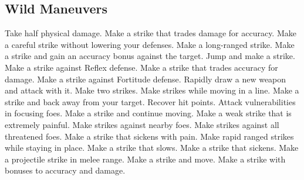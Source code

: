 \subsection{Wild Maneuvers}\label{Wild Maneuvers}
\begin{spelllist}
 Take half physical damage.
 Make a strike that trades damage for accuracy.
 Make a careful strike without lowering your defenses.
 Make a long-ranged strike.
 Make a strike and gain an accuracy bonus against the target.
 Jump and make a strike.
 Make a strike against Reflex defense.
 Make a strike that trades accuracy for damage.
 Make a strike against Fortitude defense.
 Rapidly draw a new weapon and attack with it.
 Make two strikes.
 Make strikes while moving in a line.
 Make a strike and back away from your target.
 Recover hit points.
 Attack vulnerabilities in focusing foes.
 Make a strike and continue moving.
 Make a weak strike that is extremely painful.
 Make strikes against nearby foes.
 Make strikes against all threatened foes.
 Make a strike that sickens with pain.
 Make rapid ranged strikes while staying in place.
 Make a strike that slows.
 Make a strike that sickens.
 Make a projectile strike in melee range.
 Make a strike and move.
 Make a strike with bonuses to accuracy and damage.
\end{spelllist}
